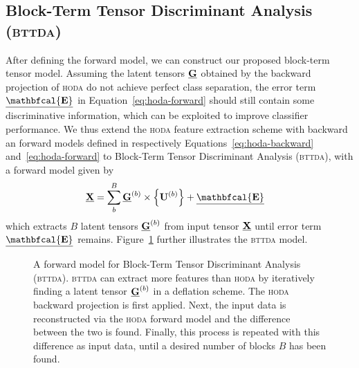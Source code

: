 \documentclass[twocolumn]{article}
\begin{document}
\subsection{Block-Term Tensor Discriminant Analysis (\textsc{bttda})}
After defining the forward model, we can construct our proposed block-term
tensor model. Assuming the latent tensors $\underline{\mathbf{G}}$
obtained by the backward projection of \textsc{hoda} do not achieve perfect
class separation, the error term $\ten{\mathbfcal{E}}$ in
Equation~\ref{eq:hoda-forward} should still contain some discriminative
information, which can be exploited to improve classifier performance.
We thus extend the \textsc{hoda} feature extraction scheme with backward an
forward models defined in respectively Equations~\ref{eq:hoda-backward}
and~\ref{eq:hoda-forward} to Block-Term Tensor Discriminant Analysis
(\textsc{bttda}), with a forward model given by
\begin{align}
  \ten{X} & = \sum_b^B\ten{G}^{(b)}\mmpr{\mat{U}^{(b)}} + \ten{\mathbfcal{E}}
  \label{eq:bttda-forward}
\end{align}
which extracts $B$ latent tensors $\underline{\mathbf{G}}^{(b)}$ from input tensor $\underline{\mathbf{X}}$
until error term $\ten{\mathbfcal{E}}$ remains.
Figure~\ref{fig:bttda} further illustrates the \textsc{bttda} model.
\begin{figure*}[t]
	\centering
	
  \caption{A forward model for Block-Term Tensor Discriminant Analysis
  (\textsc{bttda}). \textsc{bttda} can extract more features
 than \textsc{hoda} by iteratively finding a latent tensor $\underline{\mathbf{G}}^{(b)}$ in a
 deflation scheme.
 The \textsc{hoda} backward projection is first applied. Next, the
 input data is reconstructed via the \textsc{hoda} forward model and the
 difference between the two is found.
 Finally, this process is repeated with this difference as input data, until a
 desired number of blocks $B$ has been found.}
  \label{fig:bttda}
\end{figure*}
\end{document}
